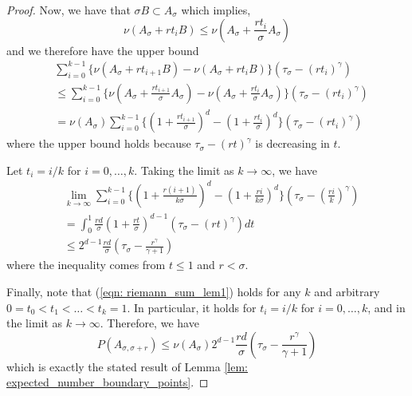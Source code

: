 \documentclass{article}
\newcommand{\Asig}{A_{\sigma}}
\newcommand{\1}{\mathbf{1}}
\theoremstyle{aldenthm}
\begin{document}
\begin{proof}
	Now, we have that $\sigma B \subset \Asig$  which implies, 
	\begin{equation*}
	\nu(\Asig + rt_iB) \leq \nu(\Asig + \frac{r t_i}{\sigma} \Asig)
	\end{equation*}
	and we therefore have the upper bound
	\begin{align}
	\label{eqn: riemann_sum_lem1}
	& \sum_{i = 0}^{k-1} \biggl\{\nu(\Asig + rt_{i+1}B) - \nu(\Asig + rt_iB)\biggr\} \left(\tau_{\sigma} - (rt_i)^{\gamma}\right) \nonumber \\
	& \leq \sum_{i = 0}^{k-1} \biggl\{\nu(\Asig + \frac{r t_{i+1}}{\sigma} \Asig) - \nu(\Asig + \frac{r t_i}{\sigma} \Asig)\biggr\} \left(\tau_{\sigma} - (rt_i)^{\gamma}\right) \nonumber \\
	& = \nu(\Asig) \sum_{i = 0}^{k-1} \biggl\{ (1 + \frac{r t_{i+1}}{\sigma})^d - (1 + \frac{r t_{i}}{\sigma})^d \biggr\} \left(\tau_{\sigma} - (rt_i)^{\gamma}\right) 
	\end{align}
	where the upper bound holds because $\tau_{\sigma} - (rt)^{\gamma}$ is decreasing in $t$.
	
	Let $t_{i} = i/k$ for $i = 0, \ldots, k$. Taking the limit as $k \to \infty$, we have
	\begin{align*}
	& \lim_{k \to \infty} \sum_{i = 0}^{k-1} \biggl\{ \left(1 + \frac{r (i+1)}{k\sigma}\right)^d - \left(1 + \frac{r i}{k\sigma}\right)^d \biggr\} \left(\tau_{\sigma} - \left(\frac{ri}{k}\right)^{\gamma}\right)  \\
	 & = \int_{0}^{1} \frac{rd}{\sigma} (1 + \frac{r t}{\sigma})^{d-1} (\tau_{\sigma} - (rt)^{\gamma}) dt \\
	& \leq 2^{d-1} \frac{rd}{\sigma} \left(\tau_{\sigma} - \frac{r^{\gamma }}{\gamma + 1}\right)
	\end{align*}
	where the inequality comes from $t \leq 1$ and $r < \sigma$. 
	
	Finally, note that (\ref{eqn: riemann_sum_lem1}) holds for any $k$ and arbitrary $0 = t_0 < t_1 < \ldots < t_k = 1$. In particular, it holds for $t_{i} = i/k$ for $i = 0, \ldots, k$, and in the limit as $k \to \infty$. Therefore, we have
	\begin{equation*}
	P(A_{\sigma, \sigma + r}) \leq \nu(\Asig) 2^{d-1} \frac{rd}{\sigma}  \left(\tau_{\sigma} - \frac{r^{\gamma}}{\gamma + 1}\right)
	\end{equation*}
	which is exactly the stated result of Lemma \ref{lem: expected_number_boundary_points}.
\end{proof}
\end{document}
